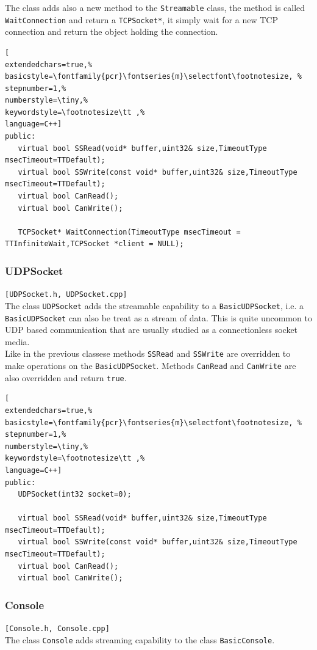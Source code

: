 The class adds also a new method to the \texttt{Streamable} class, the method is called \texttt{WaitConnection} and return a \texttt{TCPSocket*}, it simply wait for a new TCP connection and return the object holding the connection.
\begin{lstlisting}[
extendedchars=true,%
basicstyle=\fontfamily{pcr}\fontseries{m}\selectfont\footnotesize, %
stepnumber=1,%
numberstyle=\tiny,%
keywordstyle=\footnotesize\tt ,%
language=C++]
public:
   virtual bool SSRead(void* buffer,uint32& size,TimeoutType msecTimeout=TTDefault);
   virtual bool SSWrite(const void* buffer,uint32& size,TimeoutType msecTimeout=TTDefault);
   virtual bool CanRead();
   virtual bool CanWrite();

   TCPSocket* WaitConnection(TimeoutType msecTimeout = TTInfiniteWait,TCPSocket *client = NULL);
\end{lstlisting}



\subsubsection{UDPSocket}
\texttt{[UDPSocket.h, UDPSocket.cpp]}\\
The class \texttt{UDPSocket} adds the streamable capability to a \texttt{BasicUDPSocket}, i.e. a \texttt{BasicUDPSocket} can also be treat as a stream of data. This is quite uncommon to UDP based communication that are usually studied as a connectionless socket media.\\


Like in the previous classese methods \texttt{SSRead} and \texttt{SSWrite} are overridden to make operations on the \texttt{BasicUDPSocket}. Methods \texttt{CanRead} and \texttt{CanWrite} are also overridden and return \texttt{true}.
\begin{lstlisting}[
extendedchars=true,%
basicstyle=\fontfamily{pcr}\fontseries{m}\selectfont\footnotesize, %
stepnumber=1,%
numberstyle=\tiny,%
keywordstyle=\footnotesize\tt ,%
language=C++]
public:
   UDPSocket(int32 socket=0);

   virtual bool SSRead(void* buffer,uint32& size,TimeoutType msecTimeout=TTDefault);
   virtual bool SSWrite(const void* buffer,uint32& size,TimeoutType msecTimeout=TTDefault);
   virtual bool CanRead();
   virtual bool CanWrite();
\end{lstlisting}



\subsubsection{Console}
\texttt{[Console.h, Console.cpp]}\\
The class \texttt{Console} adds streaming capability to the class \texttt{BasicConsole}.

